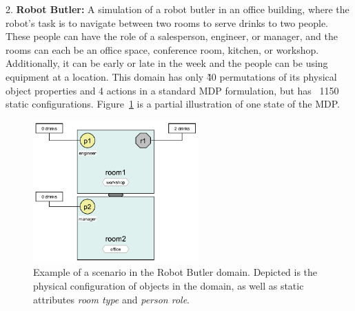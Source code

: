 
2. \textbf{Robot Butler:} 
A simulation of a robot butler in an office building, where the robot's task is 
to navigate between two rooms to serve drinks to two people. These people can 
have the role of a salesperson, engineer, or manager, and the rooms can each be 
an office space, conference room, kitchen, or workshop. Additionally, it can be 
early or late in the week and the people can be using equipment at a location. 
This domain has only \~40 permutations of its physical object properties and 4 
actions in a standard MDP formulation, but has ~1150 static configurations. 
Figure~\ref{fig:robotbutler} is a partial illustration of one state of the MDP. 

\begin{figure}[t]
  \centerline{\includegraphics[width=2.5in]{robot-butler-domain}}
  \caption{Example of a scenario in the Robot Butler domain. Depicted is the 
  physical configuration of objects in the domain, as well as static attributes 
  \textit{room type} and \textit{person role}.}
\label{fig:robotbutler} 
\vspace{1mm}
\end{figure}








